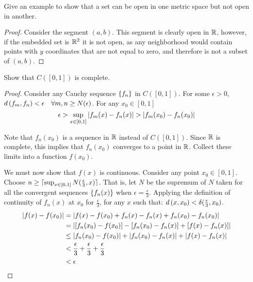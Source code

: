 \documentclass[12pt, letterpaper]{paper}
\begin{document}
\begin{question}
  Give an example to show that a set can be open in one metric space
  but not open in another.

  \begin{proof}
    Consider the segment $(a,b)$. This segment is clearly open in
    $\mathbb{R}$, however, if the embedded set is $\mathbb{R}^2$ it is not open,
    as any neighborhood would contain points with $y$ coordinates
    that are not equal to zero, and therefore is not a subset of $(a,b)$.
  \end{proof}
\end{question}

\begin{question}
  Show that $C([0,1])$ is complete.

  \begin{proof}
    Consider any Cauchy sequence ${\left \{ f_n \right \}}$ in $C([0,1])$. For some
    $\epsilon > 0$, $d \left ( f_m, f_n \right ) < \epsilon \quad \forall m,n \geq N(\epsilon)$. For any $x_0 \in
    [0,1]$
    \begin{equation*}
      \epsilon > \sup_{x \in [0,1]} \left \lvert  f_m(x) - f_n(x) \right \rvert > \left \lvert  f_m(x_0) -
        f_n (x_0) \right \rvert
    \end{equation*}


    Note that $f_n(x_0)$ is a sequence in $\mathbb{R}$ instead of
    $C([0,1])$. Since $\mathbb{R}$ is complete, this implies that
    $f_n(x_0)$ converges to a point in $\mathbb{R}$. Collect these limits
    into a function $f(x_0)$.

    We must now show that $f(x)$ is continuous. Consider any point
    $x_0 \in [0,1]$. Choose
    $n \geq \lceil \sup_{x \in [0,1]} N( \frac{\epsilon}{3}, x)\rceil$. That is, let
    $N$ be the supremum of $N$ taken for all the convergent sequences
    ${\left \{ f_n(x) \right \}}$ when $\epsilon= \frac{\epsilon}{3}.$ Applying the definition of
    continuity of $f_n(x)$ at $x_0$ for $\frac{\epsilon}{3}$, for any
    $x$ such that: $d \left ( x,x_0 \right ) < \delta( \frac{\epsilon}{3}, x_0)$.
    \begin{align*}
     \left \lvert  f(x) - f(x_0) \right \rvert &= \left \lvert f(x) - f(x_0) + f_n(x) - f_n(x) +
                            f_n(x_0) -f_n(x_0) \right \rvert\\
                          &= \left \lvert  \left [  f_n(x_0) - f(x_0) \right ] - \left [ f_n(x_0) -
                              f_n(x) \right ] + \left [ f(x) - f_n(x) \right ] \right \rvert\\
                          &\leq \left \lvert  f_n(x_0) - f(x_0) \right \rvert + \left \lvert  f_n(x_0)
                            - f_n(x) \right \rvert + \left \lvert  f(x) - f_n(x) \right \rvert\\
                          &< \frac{\epsilon}{3} + \frac{\epsilon}{3} + \frac{\epsilon}{3}\\
                          &< \epsilon\\
    \end{align*}


\end{proof}
\end{question}
\end{document}
